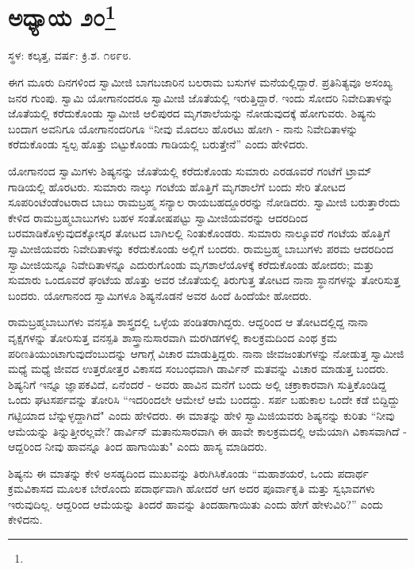\newpage

\chapter[ಅಧ್ಯಾಯ ೨೦]{ಅಧ್ಯಾಯ ೨೦\protect\footnote{}}

\centerline{ಸ್ಥಳ: ಕಲ್ಕತ್ತ, ವರ್ಷ: ಕ್ರಿ.ಶ. ೧೮೯೮.}

ಈಗ ಮೂರು ದಿನಗಳಿಂದ ಸ್ವಾಮೀಜಿ ಬಾಗಬಜಾರಿನ ಬಲರಾಮ ಬಸುಗಳ ಮನೆಯಲ್ಲಿದ್ದಾರೆ. ಪ್ರತಿನಿತ್ಯವೂ ಅಸಂಖ್ಯ ಜನರ ಗುಂಪು. ಸ್ವಾಮಿ ಯೋಗಾನಂದರೂ ಸ್ವಾಮೀಜಿ ಜೊತೆಯಲ್ಲಿ ಇರುತ್ತಿದ್ದಾರೆ. ಇಂದು ಸೋದರಿ ನಿವೇದಿತಾಳನ್ನು ಜೊತೆಯಲ್ಲಿ ಕರೆದುಕೊಂಡು ಸ್ವಾಮೀಜಿ ಆಲಿಪುರದ ಮೃಗಶಾಲೆಯನ್ನು ನೋಡುವುದಕ್ಕೆ ಹೋಗುವರು. ಶಿಷ್ಯನು ಬಂದಾಗ ಅವನಿಗೂ ಯೋಗಾನಂದರಿಗೂ “ನೀವು ಮೊದಲು ಹೊರಟು ಹೋಗಿ - ನಾನು ನಿವೇದಿತಾಳನ್ನು ಕರೆದುಕೊಂಡು ಸ್ವಲ್ಪ ಹೊತ್ತು ಬಿಟ್ಟುಕೊಂಡು ಗಾಡಿಯಲ್ಲಿ ಬರುತ್ತೇನೆ” ಎಂದು ಹೇಳಿದರು.

ಯೋಗಾನಂದ ಸ್ವಾಮಿಗಳು ಶಿಷ್ಯನನ್ನು ಜೊತೆಯಲ್ಲಿ ಕರೆದುಕೊಂಡು ಸುಮಾರು ಎರಡೂವರೆ ಗಂಟೆಗೆ ಟ್ರಾಮ್ ಗಾಡಿಯಲ್ಲಿ ಹೊರಟರು. ಸುಮಾರು ನಾಲ್ಕು ಗಂಟೆಯ ಹೊತ್ತಿಗೆ ಮೃಗಶಾಲೆಗೆ ಬಂದು ಸೇರಿ ತೋಟದ ಸೂಪರಿಂಟೆಂಡೆಂಟರಾದ ಬಾಬು ರಾಮಬ್ರಹ್ಮ ಸನ್ಯಾಲ ರಾಯಬಹದ್ದೂರರನ್ನು ನೋಡಿದರು. ಸ್ವಾಮೀಜಿ ಬರುತ್ತಾರೆಂದು ಕೇಳಿದ ರಾಮಬ್ರಹ್ಮಬಾಬುಗಳು ಬಹಳ ಸಂತೋಷಪಟ್ಟು ಸ್ವಾಮೀಜಿಯವರನ್ನು ಆದರದಿಂದ ಬರಮಾಡಿಕೊಳ್ಳುವುದಕ್ಕೋಸ್ಕರ ತೋಟದ ಬಾಗಿಲಲ್ಲಿ ನಿಂತುಕೊಂಡರು. ಸುಮಾರು ನಾಲ್ಕೂವರೆ ಗಂಟೆಯ ಹೊತ್ತಿಗೆ ಸ್ವಾಮೀಜಿಯವರು ನಿವೇದಿತಾಳನ್ನು ಕರೆದುಕೊಂಡು ಅಲ್ಲಿಗೆ ಬಂದರು. ರಾಮಬ್ರಹ್ಮ ಬಾಬುಗಳು ಪರಮ ಆದರದಿಂದ ಸ್ವಾಮೀಜಿಯನ್ನೂ ನಿವೇದಿತಾಳನ್ನೂ ಎದುರುಗೊಂಡು ಮೃಗಶಾಲೆಯೊಳಕ್ಕೆ ಕರೆದುಕೊಂಡು ಹೋದರು; ಮತ್ತು ಸುಮಾರು ಒಂದೂವರೆ ಘಂಟೆಯ ಹೊತ್ತು ಅವರ ಜೊತೆಯಲ್ಲಿ ತಿರುಗುತ್ತ ತೋಟದ ನಾನಾ ಸ್ಥಾನಗಳನ್ನು ತೋರಿಸುತ್ತ ಬಂದರು. ಯೋಗಾನಂದ ಸ್ವಾಮಿಗಳೂ ಶಿಷ್ಯನೊಡನೆ ಅವರ ಹಿಂದೆ ಹಿಂದೆಯೇ ಹೋದರು.

ರಾಮಬ್ರಹ್ಮಬಾಬುಗಳು ವನಸ್ಪತಿ ಶಾಸ್ತ್ರದಲ್ಲಿ ಒಳ್ಳೆಯ ಪಂಡಿತರಾಗಿದ್ದರು. ಆದ್ದರಿಂದ ಆ ತೋಟದಲ್ಲಿದ್ದ ನಾನಾ ವೃಕ್ಷಗಳನ್ನು ತೋರಿಸುತ್ತ ವನಸ್ಪತಿ ಶಾಸ್ತ್ರಾನುಸಾರವಾಗಿ ಮರಗಿಡಗಳಲ್ಲಿ ಕಾಲಕ್ರಮದಿಂದ ಎಂಥ ಕ್ರಮ ಪರಿಣತಿಯುಂಟಾಗುವುದೆಂಬುದನ್ನು ಆಗಾಗ್ಗೆ ವಿಚಾರ ಮಾಡುತ್ತಿದ್ದರು. ನಾನಾ ಜೀವಜಂತುಗಳನ್ನು ನೋಡುತ್ತ ಸ್ವಾಮೀಜಿ ಮಧ್ಯೆ ಮಧ್ಯೆ ಜೀವದ ಉತ್ತರೋತ್ತರ ವಿಕಾಸದ ಸಂಬಂಧವಾಗಿ ಡಾರ್ವಿನ್ ಮತವನ್ನು ವಿಚಾರ ಮಾಡುತ್ತ ಬಂದರು. ಶಿಷ್ಯನಿಗೆ ಇನ್ನೂ ಜ್ಞಾಪಕವಿದೆ, ಏನೆಂದರೆ - ಅವರು ಹಾವಿನ ಮನೆಗೆ ಬಂದು ಅಲ್ಲಿ ಚಕ್ರಾಕಾರವಾಗಿ ಸುತ್ತಿಕೊಂಡಿದ್ದ ಒಂದು ಘಟಸರ್ಪವನ್ನು ತೋರಿಸಿ “ಇದರಿಂದಲೇ ಆಮೇಲೆ ಆಮೆ ಬಂದದ್ದು. ಸರ್ಪ ಬಹುಕಾಲ ಒಂದೇ ಕಡೆ ಬಿದ್ದಿದ್ದು ಗಟ್ಟಿಯಾದ ಬೆನ್ನುಳ್ಳದ್ದಾಗಿದೆ" ಎಂದು ಹೇಳಿದರು. ಈ ಮಾತನ್ನು ಹೇಳಿ ಸ್ವಾಮಿಜಿಯವರು ಶಿಷ್ಯನನ್ನು ಕುರಿತು “ನೀವು ಆಮೆಯನ್ನು ತಿನ್ನುತ್ತೀರಲ್ಲವೇ? ಡಾರ್ವಿನ್ ಮತಾನುಸಾರವಾಗಿ ಈ ಹಾವೇ ಕಾಲಕ್ರಮದಲ್ಲಿ ಆಮೆಯಾಗಿ ವಿಕಾಸವಾಗಿದೆ - ಆದ್ದರಿಂದ ನೀವು ಹಾವನ್ನೂ ತಿಂದ ಹಾಗಾಯಿತು" ಎಂದು ಹಾಸ್ಯ ಮಾಡಿದರು.

ಶಿಷ್ಯನು ಈ ಮಾತನ್ನು ಕೇಳಿ ಅಸಹ್ಯದಿಂದ ಮುಖವನ್ನು ತಿರುಗಿಸಿಕೊಂಡು “ಮಹಾಶಯರೆ, ಒಂದು ಪದಾರ್ಥ ಕ್ರಮವಿಕಾಸದ ಮೂಲಕ ಬೇರೊಂದು ಪದಾರ್ಥವಾಗಿ ಹೋದರೆ ಆಗ ಅದರ ಪೂರ್ವಾಕೃತಿ ಮತ್ತು ಸ್ವಭಾವಗಳು ಇರುವುದಿಲ್ಲ. ಆದ್ದರಿಂದ ಆಮೆಯನ್ನು ತಿಂದರೆ ಹಾವನ್ನು ತಿಂದಹಾಗಾಯಿತು ಎಂದು ಹೇಗೆ ಹೇಳುವಿರಿ?” ಎಂದು ಕೇಳಿದನು.

